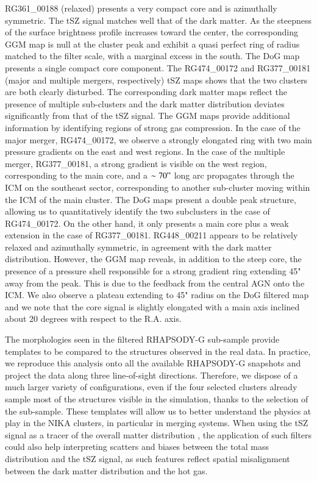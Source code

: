\documentclass[twocolumn,traditabstract]{aa}
\begin{document}
RG361\_00188 (relaxed) presents a very compact core and is azimuthally symmetric. The tSZ signal matches well that of the dark matter. As the steepness of the surface brightness profile increases toward the center, the corresponding GGM map is null at the cluster peak and exhibit a quasi perfect ring of radius matched to the filter scale, with a marginal excess in the south. The DoG map presents a single compact core component. The RG474\_00172 and RG377\_00181 (major and multiple mergers, respectively) tSZ maps shows that the two clusters are both clearly disturbed. The corresponding dark matter maps reflect the presence of multiple sub-clusters and the dark matter distribution deviates significantly from that of the tSZ signal. The GGM maps provide additional information by identifying regions of strong gas compression. In the case of the major merger, RG474\_00172, we observe a strongly elongated ring with two main pressure gradients on the east and west regions. In the case of the multiple merger, RG377\_00181, a strong gradient is visible on the west region, corresponding to the main core, and a $\sim 70"$ long arc propagates through the ICM on the southeast sector, corresponding to another sub-cluster moving within the ICM of the main cluster. The DoG maps present a double peak structure, allowing us to quantitatively identify the two subclusters in the case of RG474\_00172. On the other hand, it only presents a main core plus a weak extension in the case of RG377\_00181. RG448\_00211 appears to be relatively relaxed and azimuthally symmetric, in agreement with the dark matter distribution. However, the GGM map reveals, in addition to the steep core, the presence of a pressure shell responsible for a strong gradient ring extending 45" away from the peak. This is due to the feedback from the central AGN onto the ICM. We also observe a plateau extending to 45" radius on the DoG filtered map and we note that the core signal is slightly elongated with a main axis inclined about 20 degrees with respect to the R.A. axis.

The morphologies seen in the filtered RHAPSODY-G sub-sample provide templates to be compared to the structures observed in the real data. In practice, we reproduce this analysis onto all the available RHAPSODY-G snapshots and project the data along three line-of-sight directions. Therefore, we dispose of a much larger variety of configurations, even if the four selected clusters already sample most of the structures visible in the simulation, thanks to the selection of the sub-sample. These templates will allow us to better understand the physics at play in the NIKA clusters, in particular in merging systems. When using the tSZ signal as a tracer of the overall matter distribution \citep[e.g.,][]{Adam2015,Adam2016a,Ruppin2016}, the application of such filters could also help interpreting scatters and biases between the total mass distribution and the tSZ signal, as such features reflect spatial misalignment between the dark matter distribution and the hot gas.
\end{document}
